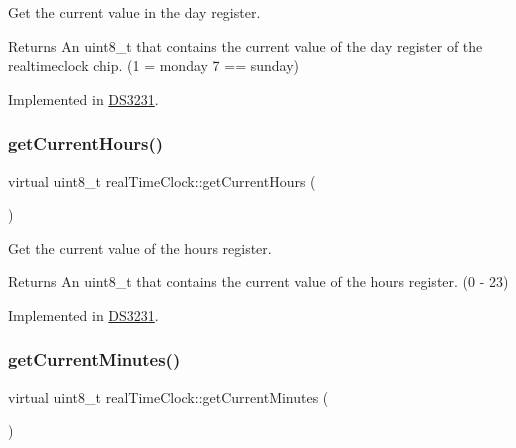Get the current value in the day register. 

\begin{DoxyReturn}{Returns}
An uint8\+\_\+t that contains the current value of the day register of the realtimeclock chip. (1 = monday 7 == sunday) 
\end{DoxyReturn}


Implemented in \mbox{\hyperlink{class_d_s3231_a813bbe55a08e1911d498511795721477}{D\+S3231}}.

\mbox{\label{classreal_time_clock_a2861a9bc75466a762b4cd8ce37193247}} 
\subsubsection{\texorpdfstring{get\+Current\+Hours()}{getCurrentHours()}}
{\footnotesize\ttfamily virtual uint8\+\_\+t real\+Time\+Clock\+::get\+Current\+Hours (\begin{DoxyParamCaption}{ }\end{DoxyParamCaption})\hspace{0.3cm}{\ttfamily [pure virtual]}}



Get the current value of the hours register. 

\begin{DoxyReturn}{Returns}
An uint8\+\_\+t that contains the current value of the hours register. (0 -\/ 23) 
\end{DoxyReturn}


Implemented in \mbox{\hyperlink{class_d_s3231_a019d8ed8074a02937c0777424be3d0ae}{D\+S3231}}.

\mbox{\label{classreal_time_clock_a8436f171be03d35a931004b3f3b144e9}} 
\subsubsection{\texorpdfstring{get\+Current\+Minutes()}{getCurrentMinutes()}}
{\footnotesize\ttfamily virtual uint8\+\_\+t real\+Time\+Clock\+::get\+Current\+Minutes (\begin{DoxyParamCaption}{ }\end{DoxyParamCaption})\hspace{0.3cm}{\ttfamily [pure virtual]}}



